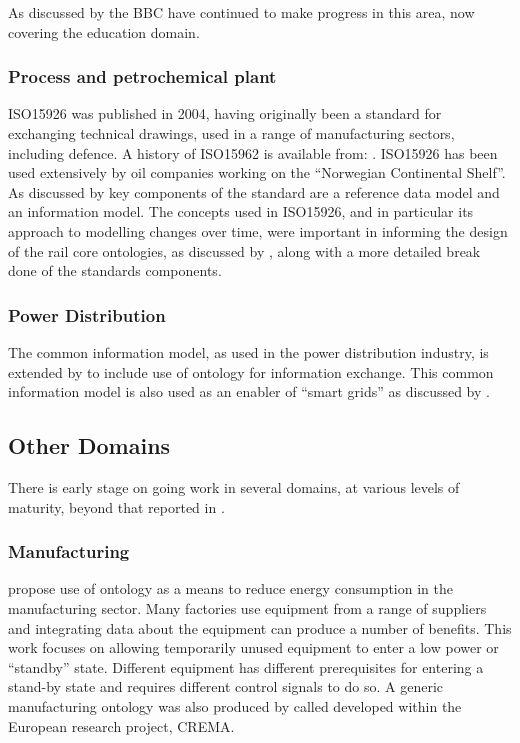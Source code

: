 As discussed by \citet{Mikroyannidi2016} the BBC have continued to make progress in this area, now covering the education domain.  
\subsubsection{Process and petrochemical plant}
 ISO15926 was published in 2004, having originally been a standard for exchanging technical drawings, used in a range of manufacturing sectors, including defence. A history of ISO15962 is available from: \citep{POSCCaesarAssociation2011}. ISO15926 has been used extensively by oil companies working on the ``Norwegian Continental Shelf''. As discussed by \citet{Leal2005} key components of the standard are a reference data model and an information model. The concepts used in ISO15926, and in particular its approach to modelling changes over time, were important in informing the design of the rail core ontologies, as discussed by \citet{Tutcher2015}, along with a more detailed break done of the standards components. 
\subsubsection{Power Distribution}
The common information model, as used in the power distribution industry, is extended by \citet{Hargreaves2013} to include use of ontology for information exchange. This common information model is also used as an enabler of ``smart grids'' as discussed by \citet{Fremont}.

\subsection{Other Domains}
There is early stage on going work in several domains, at various levels of maturity, beyond that reported in \citep{Morris2014}.

 \subsubsection{Manufacturing}
\citet{Mueller2015} propose use of ontology as a means to reduce energy consumption in the manufacturing sector. Many factories use equipment from a range of suppliers and integrating data about the equipment can produce a number of benefits. This work focuses on allowing temporarily unused equipment to enter a low power or ``standby'' state. Different equipment has different prerequisites for entering a stand-by state and requires different control signals to do so. A generic manufacturing ontology was also produced by \citet{Mazzola2016} called  developed within the European research project, CREMA.
